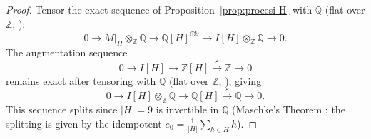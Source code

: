 \documentclass[12pt,a4paper]{article}
\theoremstyle{definition}
\begin{document}
\begin{proof}
Tensor the exact sequence of Proposition~\ref{prop:procesi-H}
with \(\mathbb{Q}\) (flat over \(\mathbb{Z}\),
\cite[Ch.II, \S 2, no.4, Th.1]{Bourbaki2006}):
\[
0 \longrightarrow M|_H \otimes_{\mathbb{Z}} \mathbb{Q} \longrightarrow
\mathbb{Q}[H]^{\oplus 9} \longrightarrow I[H] \otimes_{\mathbb{Z}} \mathbb{Q}
\longrightarrow 0 .
\]
The augmentation sequence
\begin{equation}\label{eq:aug}
0 \longrightarrow I[H] \longrightarrow \mathbb{Z}[H]
\xrightarrow{\ \varepsilon\ } \mathbb{Z} \longrightarrow 0
\end{equation}
remains exact after tensoring with \(\mathbb{Q}\) (flat over
\(\mathbb{Z}\), \cite[Ch.II, \S 2, no.4, Th.1]{Bourbaki2006}), giving
\[
0 \longrightarrow I[H] \otimes_{\mathbb{Z}} \mathbb{Q} \longrightarrow
\mathbb{Q}[H] \xrightarrow{\ \varepsilon\ } \mathbb{Q} \longrightarrow 0 .
\]
This sequence splits since \(|H| = 9\) is invertible in
\(\mathbb{Q}\) (Maschke's Theorem \cite[(3.14)]{CurtisReiner1981};
the splitting is given by the idempotent
\(e_0 = \frac{1}{|H|}\sum_{h \in H} h\)).


\end{proof}
\end{document}
